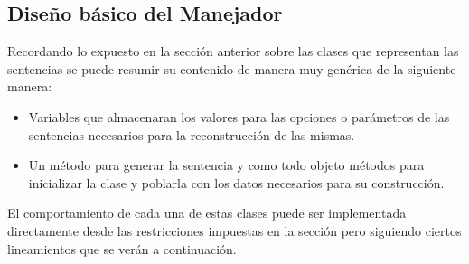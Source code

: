 \subsection{Diseño básico del Manejador}
Recordando lo expuesto en la sección anterior sobre las clases que representan las sentencias se puede resumir su contenido de manera muy genérica de la siguiente manera:
%
\begin{itemize}
\item Variables que almacenaran los valores para las opciones o parámetros de las sentencias necesarios para la reconstrucción de las mismas.
%
\item Un método para generar la sentencia y como todo objeto métodos para inicializar la clase y poblarla con los datos necesarios para su construcción.
%
\end{itemize}
%
El comportamiento de cada una de estas clases puede ser implementada directamente desde las restricciones impuestas en la sección  pero siguiendo ciertos lineamientos que  se verán a continuación.

